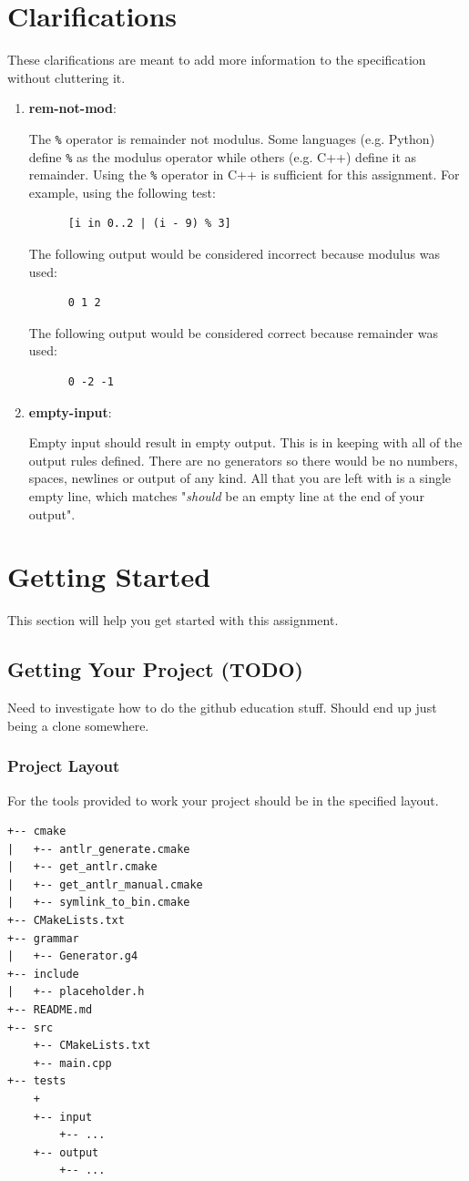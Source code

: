 \documentclass{article}
\newcommand{\code}[1]{\texttt{\textmd{#1}}}
\newcommand{\clarificationdest}[1]{\hypertarget{#1}{\textbf{#1}:}}
\begin{document}
\section{Clarifications}
These clarifications are meant to add more information to the specification without cluttering it.
\begin{enumerate}
  \item
    \clarificationdest{rem-not-mod}
    The \code{\%} operator is remainder not modulus. Some languages (e.g. Python) define \code{\%}
    as the modulus operator while others (e.g. C++) define it as remainder. Using the \code{\%}
    operator in C++ is sufficient for this assignment. For example, using the
    following test:
    \begin{lstlisting}
      [i in 0..2 | (i - 9) % 3]
    \end{lstlisting}
    The following output would be considered incorrect because modulus was used:
    \begin{lstlisting}
      0 1 2
    \end{lstlisting}
    The following output would be considered correct because remainder was used:
    \begin{lstlisting}
      0 -2 -1
    \end{lstlisting}
  \item
    \clarificationdest{empty-input}
    Empty input should result in empty output. This is in keeping with all of the output rules
    defined. There are no generators so there would be no numbers, spaces, newlines or output of
    any kind. All that you are left with is a single empty line, which matches "\textit{should} be
    an empty line at the end of your output".

\end{enumerate}

\section{Getting Started}
This section will help you get started with this assignment.

\subsection{Getting Your Project (TODO)}
Need to investigate how to do the github education stuff. Should end up just being a clone
somewhere.

\subsubsection{Project Layout}
For the tools provided to work your project should be in the specified layout.
\begin{lstlisting}
+-- cmake
|   +-- antlr_generate.cmake
|   +-- get_antlr.cmake
|   +-- get_antlr_manual.cmake
|   +-- symlink_to_bin.cmake
+-- CMakeLists.txt
+-- grammar
|   +-- Generator.g4
+-- include
|   +-- placeholder.h
+-- README.md
+-- src
    +-- CMakeLists.txt
    +-- main.cpp
+-- tests
    +
    +-- input
        +-- ...
    +-- output
        +-- ...
\end{lstlisting}
\end{document}

